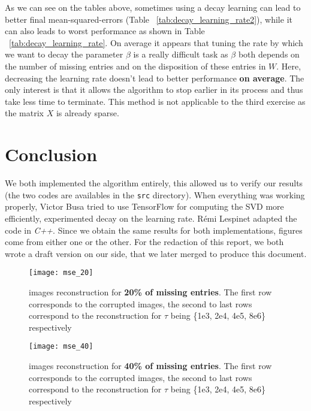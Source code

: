 \documentclass[a4paper, 11pt]{article}
\newcommand{\file}[1]{\lstinline{#1}}
\newcommand{\name}[1]{\emph{#1}}
\begin{document}
As we can see on the tables above, sometimes using a decay learning
can lead to better final mean-squared-errors (Table
~\ref{tab:decay_learning_rate2}), while it can also leads to worst
performance as shown in Table ~\ref{tab:decay_learning_rate}. On
average it appears that tuning the rate by which we want to decay the
parameter $\beta$ is a really difficult task as $\beta$ both depends
on the number of missing entries and on the disposition of these
entries in $W$. Here, decreasing the learning rate doesn't lead to
better performance \textbf{on average}. The only interest is that it
allows the algorithm to stop earlier in its process and thus take less
time to terminate. This method is not applicable to the third exercise
as the matrix $X$ is already sparse.

\section{Conclusion}

We both implemented the algorithm entirely, this allowed us to verify
our results (the two codes are availables in the \file{src}
directory).  When everything was working properly, Victor Busa tried
to use TensorFlow for computing the SVD more efficiently, experimented
decay on the learning rate. Rémi Lespinet adapted the code in
\name{C++}. Since we obtain the same results for both implementations,
figures come from either one or the other. For the redaction of this
report, we both wrote a draft version on our side, that we later
merged to produce this document.



\clearpage

\begin{figure}[p]
  \centering
  \texttt{[image: mse\_20]}
  \caption{images reconstruction for \textbf{20\% of missing
      entries}. The first row corresponds to the corrupted images, the
    second to last rows correspond to the reconstruction for $\tau$
    being \{1e3, 2e4, 4e5, 8e6\} respectively}
  \label{fig:mse20}
\end{figure}
\begin{figure}[p]
  \centering
  \texttt{[image: mse\_40]}
  \caption{\small{images reconstruction for \textbf{40\% of missing
      entries}. The first row corresponds to the corrupted images, the
    second to last rows correspond to the reconstruction for $\tau$
    being \{1e3, 2e4, 4e5, 8e6\} respectively}}
  \label{fig:mse40}
\end{figure}
\end{document}
